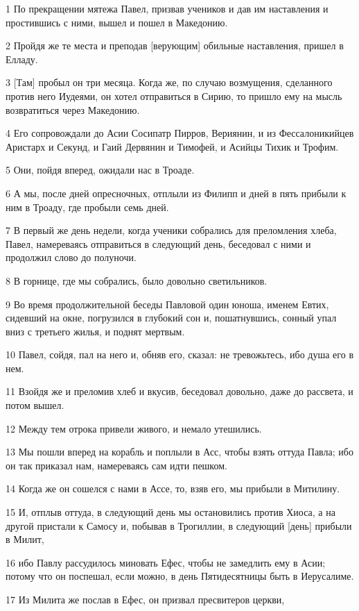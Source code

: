 \par 1 По прекращении мятежа Павел, призвав учеников и дав им наставления и простившись с ними, вышел и пошел в Македонию.
\par 2 Пройдя же те места и преподав [верующим] обильные наставления, пришел в Елладу.
\par 3 [Там] пробыл он три месяца. Когда же, по случаю возмущения, сделанного против него Иудеями, он хотел отправиться в Сирию, то пришло ему на мысль возвратиться через Македонию.
\par 4 Его сопровождали до Асии Сосипатр Пирров, Вериянин, и из Фессалоникийцев Аристарх и Секунд, и Гаий Дервянин и Тимофей, и Асийцы Тихик и Трофим.
\par 5 Они, пойдя вперед, ожидали нас в Троаде.
\par 6 А мы, после дней опресночных, отплыли из Филипп и дней в пять прибыли к ним в Троаду, где пробыли семь дней.
\par 7 В первый же день недели, когда ученики собрались для преломления хлеба, Павел, намереваясь отправиться в следующий день, беседовал с ними и продолжил слово до полуночи.
\par 8 В горнице, где мы собрались, было довольно светильников.
\par 9 Во время продолжительной беседы Павловой один юноша, именем Евтих, сидевший на окне, погрузился в глубокий сон и, пошатнувшись, сонный упал вниз с третьего жилья, и поднят мертвым.
\par 10 Павел, сойдя, пал на него и, обняв его, сказал: не тревожьтесь, ибо душа его в нем.
\par 11 Взойдя же и преломив хлеб и вкусив, беседовал довольно, даже до рассвета, и потом вышел.
\par 12 Между тем отрока привели живого, и немало утешились.
\par 13 Мы пошли вперед на корабль и поплыли в Асс, чтобы взять оттуда Павла; ибо он так приказал нам, намереваясь сам идти пешком.
\par 14 Когда же он сошелся с нами в Ассе, то, взяв его, мы прибыли в Митилину.
\par 15 И, отплыв оттуда, в следующий день мы остановились против Хиоса, а на другой пристали к Самосу и, побывав в Трогиллии, в следующий [день] прибыли в Милит,
\par 16 ибо Павлу рассудилось миновать Ефес, чтобы не замедлить ему в Асии; потому что он поспешал, если можно, в день Пятидесятницы быть в Иерусалиме.
\par 17 Из Милита же послав в Ефес, он призвал пресвитеров церкви,
